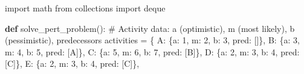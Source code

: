 \documentclass[
  letterpaper,
  DIV=11,
  numbers=noendperiod]{scrreprt}
\newenvironment{Shaded}{\begin{snugshade}}{\end{snugshade}}
\newcommand{\CommentTok}[1]{\textcolor[rgb]{0.37,0.37,0.37}{#1}}
\newcommand{\DecValTok}[1]{\textcolor[rgb]{0.68,0.00,0.00}{#1}}
\newcommand{\ImportTok}[1]{\textcolor[rgb]{0.00,0.46,0.62}{#1}}
\newcommand{\KeywordTok}[1]{\textcolor[rgb]{0.00,0.23,0.31}{\textbf{#1}}}
\newcommand{\NormalTok}[1]{\textcolor[rgb]{0.00,0.23,0.31}{#1}}
\newcommand{\OperatorTok}[1]{\textcolor[rgb]{0.37,0.37,0.37}{#1}}
\newcommand{\StringTok}[1]{\textcolor[rgb]{0.13,0.47,0.30}{#1}}
\begin{document}
\begin{Shaded}
\begin{Highlighting}[]
\ImportTok{import}\NormalTok{ math}
\ImportTok{from}\NormalTok{ collections }\ImportTok{import}\NormalTok{ deque}

\KeywordTok{def}\NormalTok{ solve\_pert\_problem():}
    \CommentTok{\# Activity data: a (optimistic), m (most likely), b (pessimistic), predecessors}
\NormalTok{    activities }\OperatorTok{=}\NormalTok{ \{}
        \StringTok{\textquotesingle{}A\textquotesingle{}}\NormalTok{: \{}\StringTok{\textquotesingle{}a\textquotesingle{}}\NormalTok{: }\DecValTok{1}\NormalTok{, }\StringTok{\textquotesingle{}m\textquotesingle{}}\NormalTok{: }\DecValTok{2}\NormalTok{, }\StringTok{\textquotesingle{}b\textquotesingle{}}\NormalTok{: }\DecValTok{3}\NormalTok{, }\StringTok{\textquotesingle{}pred\textquotesingle{}}\NormalTok{: []\},}
        \StringTok{\textquotesingle{}B\textquotesingle{}}\NormalTok{: \{}\StringTok{\textquotesingle{}a\textquotesingle{}}\NormalTok{: }\DecValTok{3}\NormalTok{, }\StringTok{\textquotesingle{}m\textquotesingle{}}\NormalTok{: }\DecValTok{4}\NormalTok{, }\StringTok{\textquotesingle{}b\textquotesingle{}}\NormalTok{: }\DecValTok{5}\NormalTok{, }\StringTok{\textquotesingle{}pred\textquotesingle{}}\NormalTok{: [}\StringTok{\textquotesingle{}A\textquotesingle{}}\NormalTok{]\},}
        \StringTok{\textquotesingle{}C\textquotesingle{}}\NormalTok{: \{}\StringTok{\textquotesingle{}a\textquotesingle{}}\NormalTok{: }\DecValTok{5}\NormalTok{, }\StringTok{\textquotesingle{}m\textquotesingle{}}\NormalTok{: }\DecValTok{6}\NormalTok{, }\StringTok{\textquotesingle{}b\textquotesingle{}}\NormalTok{: }\DecValTok{7}\NormalTok{, }\StringTok{\textquotesingle{}pred\textquotesingle{}}\NormalTok{: [}\StringTok{\textquotesingle{}B\textquotesingle{}}\NormalTok{]\},}
        \StringTok{\textquotesingle{}D\textquotesingle{}}\NormalTok{: \{}\StringTok{\textquotesingle{}a\textquotesingle{}}\NormalTok{: }\DecValTok{2}\NormalTok{, }\StringTok{\textquotesingle{}m\textquotesingle{}}\NormalTok{: }\DecValTok{3}\NormalTok{, }\StringTok{\textquotesingle{}b\textquotesingle{}}\NormalTok{: }\DecValTok{4}\NormalTok{, }\StringTok{\textquotesingle{}pred\textquotesingle{}}\NormalTok{: [}\StringTok{\textquotesingle{}C\textquotesingle{}}\NormalTok{]\},}
        \StringTok{\textquotesingle{}E\textquotesingle{}}\NormalTok{: \{}\StringTok{\textquotesingle{}a\textquotesingle{}}\NormalTok{: }\DecValTok{2}\NormalTok{, }\StringTok{\textquotesingle{}m\textquotesingle{}}\NormalTok{: }\DecValTok{3}\NormalTok{, }\StringTok{\textquotesingle{}b\textquotesingle{}}\NormalTok{: }\DecValTok{4}\NormalTok{, }\StringTok{\textquotesingle{}pred\textquotesingle{}}\NormalTok{: [}\StringTok{\textquotesingle{}C\textquotesingle{}}\NormalTok{]\},}

\end{Highlighting}
\end{Shaded}
\end{document}
